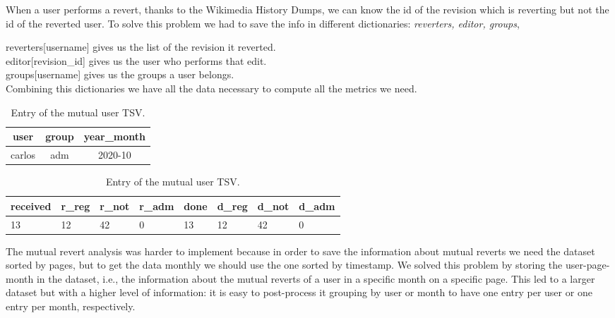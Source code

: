 When a user performs a revert, thanks to the Wikimedia History Dumps, we can know the id of the
revision which is reverting but not the id of the reverted user. To solve this problem we
had to save the info in different dictionaries: \textit{reverters, editor, groups}, 
\bigskip

reverters[username] gives us the list of the revision it reverted. \\
\indent editor[revision\_id] gives us the user who performs that edit. \\
\indent groups[username] gives us the groups a user belongs.\\

Combining this dictionaries we have all the data necessary to compute all the metrics we need.
\begin{table}[H]
    \centering
    \begin{tabularx}{\columnwidth}{@{}ccc@{}}
        \midrule
        \textbf{user} & \textbf{group} & \textbf{year\_month} \\ \toprule
        carlos & adm & 2020-10  \\
        
         \bottomrule
    \end{tabularx}
    \begin{tabularx}{\columnwidth}{@{}XXXXXXXX@{}}
        \midrule
        \textbf{received} & \textbf{r\_reg}  & \textbf{r\_not} & \textbf{r\_adm} & \textbf{done} & \textbf{d\_reg} & \textbf{d\_not} & \textbf{d\_adm}\\ \toprule
        13 & 12 & 42  & 0 & 13 & 12 & 42  & 0  \\
        
         \bottomrule
    \end{tabularx}
    
    \caption{Entry of the mutual user TSV. \label{table:revks}}
\end{table}


The mutual revert analysis was harder to implement because in order to save the information about
mutual reverts we need the dataset sorted by pages, but to get the data monthly we should use the
one sorted by timestamp. We solved this problem by storing the user-page-month in the dataset, i.e.,
the information about the mutual reverts of a user in a specific month on a specific page.
This led to a larger dataset but with a higher level of information: it is easy to post-process it
grouping by user or month to have one entry per user or one entry per month, respectively. 



